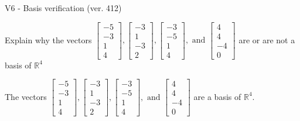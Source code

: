 \begin{exercise}
  \begin{exerciseTitle}V6 - Basis verification (ver. 412)\end{exerciseTitle}
  \begin{exerciseStatement}
    Explain why the vectors \(\left[\begin{array}{r}
-5 \\
-3 \\
1 \\
4
\end{array}\right] , \left[\begin{array}{r}
-3 \\
1 \\
-3 \\
2
\end{array}\right] , \left[\begin{array}{r}
-3 \\
-5 \\
1 \\
4
\end{array}\right] , \text{ and } \left[\begin{array}{r}
4 \\
4 \\
-4 \\
0
\end{array}\right]\) are or are not a basis of \(\mathbb{R}^4\)	


  \end{exerciseStatement}
  \begin{exerciseAnswer}
   The vectors \(\left[\begin{array}{r}
-5 \\
-3 \\
1 \\
4
\end{array}\right] , \left[\begin{array}{r}
-3 \\
1 \\
-3 \\
2
\end{array}\right] , \left[\begin{array}{r}
-3 \\
-5 \\
1 \\
4
\end{array}\right] , \text{ and } \left[\begin{array}{r}
4 \\
4 \\
-4 \\
0
\end{array}\right]\) 
  	 are  a basis of \(\mathbb{R}^4\).
  


  \end{exerciseAnswer}
\end{exercise}